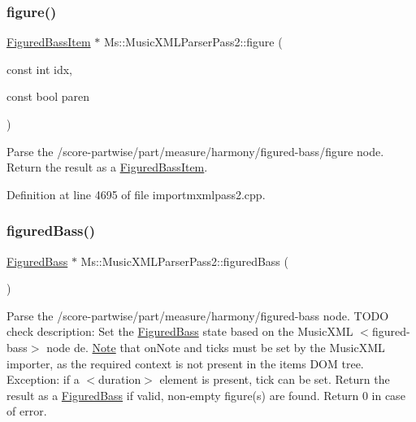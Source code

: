 \mbox{\label{class_ms_1_1_music_x_m_l_parser_pass2_a7287a04f8379ee29be57827a5dd2ebe2}} 
\subsubsection{\texorpdfstring{figure()}{figure()}}
{\footnotesize\ttfamily \hyperlink{class_ms_1_1_figured_bass_item}{Figured\+Bass\+Item} $\ast$ Ms\+::\+Music\+X\+M\+L\+Parser\+Pass2\+::figure (\begin{DoxyParamCaption}\item[{const int}]{idx,  }\item[{const bool}]{paren }\end{DoxyParamCaption})}

Parse the /score-\/partwise/part/measure/harmony/figured-\/bass/figure node. Return the result as a \hyperlink{class_ms_1_1_figured_bass_item}{Figured\+Bass\+Item}. 

Definition at line 4695 of file importmxmlpass2.\+cpp.

\mbox{\label{class_ms_1_1_music_x_m_l_parser_pass2_a6536c16b7e3cc48c77df3500969b0de6}} 
\subsubsection{\texorpdfstring{figured\+Bass()}{figuredBass()}}
{\footnotesize\ttfamily \hyperlink{class_ms_1_1_figured_bass}{Figured\+Bass} $\ast$ Ms\+::\+Music\+X\+M\+L\+Parser\+Pass2\+::figured\+Bass (\begin{DoxyParamCaption}{ }\end{DoxyParamCaption})}

Parse the /score-\/partwise/part/measure/harmony/figured-\/bass node. T\+O\+DO check description\+: Set the \hyperlink{class_ms_1_1_figured_bass}{Figured\+Bass} state based on the Music\+X\+ML $<$figured-\/bass$>$ node de. \hyperlink{class_ms_1_1_note}{Note} that on\+Note and ticks must be set by the Music\+X\+ML importer, as the required context is not present in the items D\+OM tree. Exception\+: if a $<$duration$>$ element is present, tick can be set. Return the result as a \hyperlink{class_ms_1_1_figured_bass}{Figured\+Bass} if valid, non-\/empty figure(s) are found. Return 0 in case of error. 

